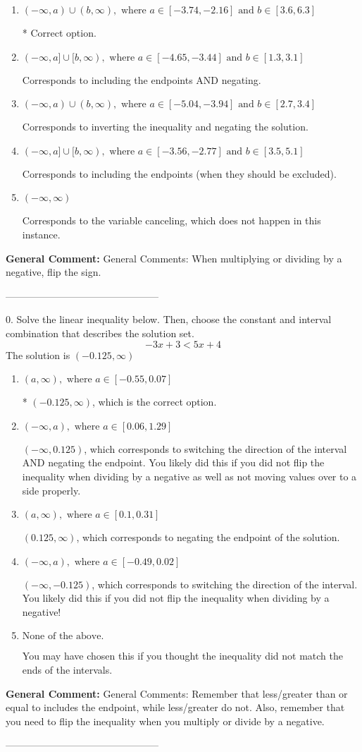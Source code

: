 \documentclass{extbook}[14pt]
\begin{document}
\begin{enumerate}[label=\Alph*.] 
\item $ (-\infty, a) \cup (b, \infty), \text{ where } a \in [-3.74, -2.16] \text{ and } b \in [3.6, 6.3] $ 

  * Correct option. 
\item $ (-\infty, a] \cup [b, \infty), \text{ where } a \in [-4.65, -3.44] \text{ and } b \in [1.3, 3.1] $ 

 Corresponds to including the endpoints AND negating. 
\item $ (-\infty, a) \cup (b, \infty), \text{ where } a \in [-5.04, -3.94] \text{ and } b \in [2.7, 3.4] $ 

 Corresponds to inverting the inequality and negating the solution. 
\item $ (-\infty, a] \cup [b, \infty), \text{ where } a \in [-3.56, -2.77] \text{ and } b \in [3.5, 5.1] $ 

 Corresponds to including the endpoints (when they should be excluded). 
\item $ (-\infty, \infty) $ 

 Corresponds to the variable canceling, which does not happen in this instance. 
\end{enumerate} 
 
\textbf{General Comment:} General Comments: When multiplying or dividing by a negative, flip the sign. 

-----------------------------------------------

0. Solve the linear inequality below. Then, choose the constant and interval combination that describes the solution set.
\[ -3x + 3 < 5x + 4 \] 
The solution is $ (-0.125, \infty) $ 

\begin{enumerate}[label=\Alph*.] 
\item $ (a, \infty), \text{ where } a \in [-0.55, 0.07] $ 

 * $(-0.125, \infty)$, which is the correct option. 
\item $ (-\infty, a), \text{ where } a \in [0.06, 1.29] $ 

  $(-\infty, 0.125)$, which corresponds to switching the direction of the interval AND negating the endpoint. You likely did this if you did not flip the inequality when dividing by a negative as well as not moving values over to a side properly. 
\item $ (a, \infty), \text{ where } a \in [0.1, 0.31] $ 

  $(0.125, \infty)$, which corresponds to negating the endpoint of the solution. 
\item $ (-\infty, a), \text{ where } a \in [-0.49, 0.02] $ 

  $(-\infty, -0.125)$, which corresponds to switching the direction of the interval. You likely did this if you did not flip the inequality when dividing by a negative! 
\item $ \text{None of the above}. $ 

 You may have chosen this if you thought the inequality did not match the ends of the intervals. 
\end{enumerate} 
 
\textbf{General Comment:} General Comments: Remember that less/greater than or equal to includes the endpoint, while less/greater do not. Also, remember that you need to flip the inequality when you multiply or divide by a negative. 

-----------------------------------------------
\end{document}
